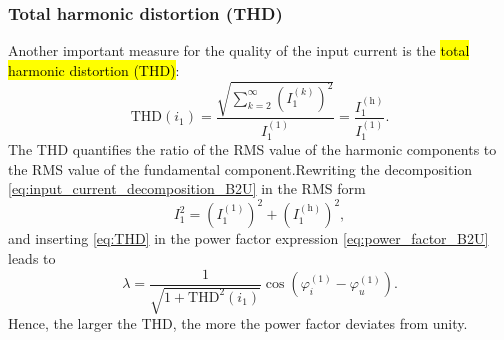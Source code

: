 \begin{frame}
    \frametitle{Total harmonic distortion (THD)}
    Another important measure for the quality of the input current is the \hl{total harmonic distortion (THD)}:  
    \begin{equation}
        \mathrm{THD}(i_1) = \frac{\sqrt{\sum_{k=2}^{\infty} \left(I_1^{(k)}\right)^2}}{I_1^{(1)}} = \frac{I_1^{(\mathrm{h})}}{I_1^{(1)}}.
        \label{eq:THD}
    \end{equation}
    The THD quantifies the ratio of the RMS value of the harmonic components to the RMS value of the fundamental component.\pause Rewriting the decomposition \eqref{eq:input_current_decomposition_B2U} in the RMS form
    \begin{equation}
        I_1^2 = \left(I_1^{(1)}\right)^2 + \left(I_1^{(\mathrm{h})}\right)^2,
    \end{equation}\pause
    and inserting \eqref{eq:THD} in the power factor expression \eqref{eq:power_factor_B2U} leads to
    \begin{equation}
        \lambda = \frac{1}{\sqrt{1+\mathrm{THD}^2(i_1)}} \cos(\varphi_i^{(1)} - \varphi_u^{(1)}).
    \end{equation}
    Hence, the larger the THD, the more the power factor deviates from unity.
\end{frame}

